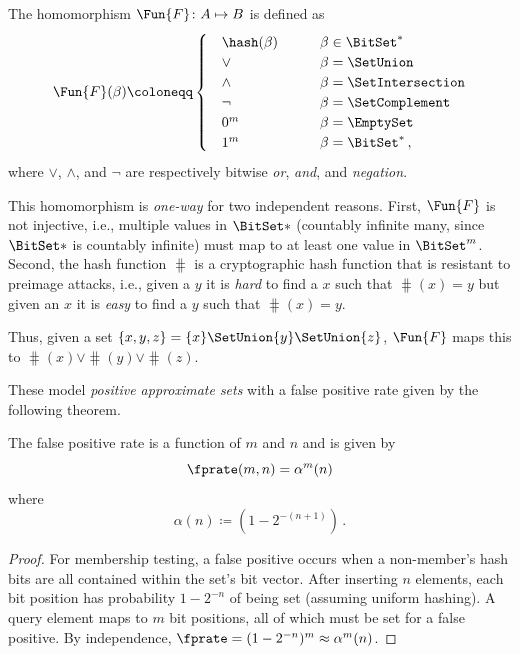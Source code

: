 \documentclass[ ../main.tex]{subfiles}
\begin{document}
\begin{definition}
The homomorphism $\Fun{F} \colon A \mapsto B$ is defined as
\begin{equation}
\Fun{F}(\beta) \coloneqq
\begin{cases} 
	\quad \hash(\beta) 		& \qquad \beta \in {\BitSet^*}\\
	\quad \lor 			& \qquad \beta = \SetUnion \\
	\quad \land 		& \qquad \beta = \SetIntersection\\
	\quad \neg			& \qquad \beta = \SetComplement\\
	\quad 0^m			& \qquad \beta = \EmptySet\\
	\quad 1^m			& \qquad \beta = {\BitSet^*}\,,
\end{cases}
\end{equation}
where $\lor$, $\land$, and $\neg$ are respectively bitwise \emph{or}, \emph{and}, and \emph{negation}.
\end{definition}

This homomorphism is \emph{one-way} for two independent reasons.
First, $\Fun{F}$ is not injective, i.e., multiple values in $\BitSet*$ (countably infinite many, since $\BitSet*$ is countably infinite) must map to at least one value in $\BitSet^m$.
Second, the hash function $\hash$ is a cryptographic hash function that is resistant to preimage attacks, i.e., given a $y$ it is \emph{hard} to find a $x$ such that $\hash(x) = y$ but given an $x$ it is \emph{easy} to find a $y$ such that $\hash(x) = y$.

Thus, given a set $\{x,y,z\} = \{x\} \SetUnion \{y\} \SetUnion \{z\}$, $\Fun{F}$ maps this to $\hash(x) \lor \hash(y) \lor \hash(z)$.

These model \emph{positive approximate sets} with a false positive rate given by the following theorem.
\begin{theorem}
The false positive rate is a function of $m$ and $n$ and is given by
\begin{equation}
	\fprate(m,n) = \alpha^m(n)
\end{equation}
where
\begin{equation}
	\alpha(n) \coloneqq \left(1-2^{-(n+1)}\right)\,.
\end{equation}
\end{theorem}
\begin{proof}
For membership testing, a false positive occurs when a non-member's hash bits are all contained within the set's bit vector. After inserting $n$ elements, each bit position has probability $1 - 2^{-n}$ of being set (assuming uniform hashing). A query element maps to $m$ bit positions, all of which must be set for a false positive. By independence, $\fprate = (1 - 2^{-n})^m \approx \alpha^m(n)$.
\end{proof}
\end{document}
